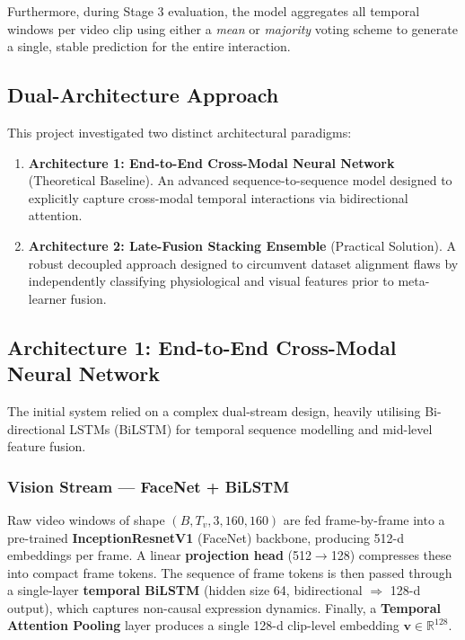 \documentclass[12pt, a4paper]{article}
\begin{document}
Furthermore, during Stage 3 evaluation, the model aggregates all temporal windows per video clip using either a \textit{mean} or \textit{majority} voting scheme to generate a single, stable prediction for the entire interaction.

\subsection{Dual-Architecture Approach}

This project investigated two distinct architectural paradigms:
\begin{enumerate}
    \item \textbf{Architecture 1: End-to-End Cross-Modal Neural Network} (Theoretical Baseline). An advanced sequence-to-sequence model designed to explicitly capture cross-modal temporal interactions via bidirectional attention.
    \item \textbf{Architecture 2: Late-Fusion Stacking Ensemble} (Practical Solution). A robust decoupled approach designed to circumvent dataset alignment flaws by independently classifying physiological and visual features prior to meta-learner fusion.
\end{enumerate}

\subsection{Architecture 1: End-to-End Cross-Modal Neural Network}

The initial system relied on a complex dual-stream design, heavily utilising Bi-directional LSTMs (BiLSTM) for temporal sequence modelling and mid-level feature fusion.

\subsubsection{Vision Stream --- FaceNet + BiLSTM}

Raw video windows of shape $(B, T_v, 3, 160, 160)$ are fed frame-by-frame into a pre-trained \textbf{InceptionResnetV1} (FaceNet) backbone, producing 512-d embeddings per frame. A linear \textbf{projection head} (512$\rightarrow$128) compresses these into compact frame tokens. The sequence of frame tokens is then passed through a single-layer \textbf{temporal BiLSTM} (hidden size 64, bidirectional $\Rightarrow$ 128-d output), which captures non-causal expression dynamics. Finally, a \textbf{Temporal Attention Pooling} layer produces a single 128-d clip-level embedding $\mathbf{v} \in \mathbb{R}^{128}$.
\end{document}
